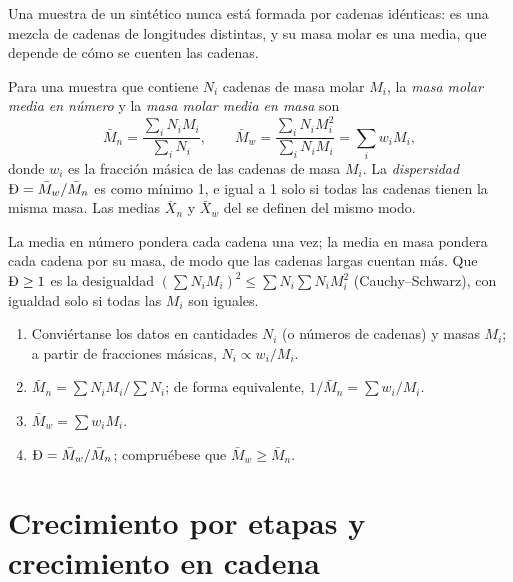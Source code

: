 Una muestra de un  sintético nunca está formada por cadenas idénticas: es una mezcla de cadenas de
longitudes distintas, y su masa molar es una media, que depende de cómo se cuenten las cadenas.

\begin{definition}\label{def:b2:polymer-synthesis:averages}
Para una muestra que contiene $N_i$ cadenas de masa molar $M_i$, la \emph{masa molar media en
número} y la \emph{masa molar media en masa}
son
\begin{equation*}
\bar M_n = \frac{\sum_i N_i M_i}{\sum_i N_i}, \qquad
\bar M_w = \frac{\sum_i N_i M_i^2}{\sum_i N_i M_i} = \sum_i w_i M_i,
\end{equation*}
donde $w_i$ es la fracción másica de las cadenas de masa $M_i$. La \emph{dispersidad}
$\text{\DH} = \bar M_w/\bar M_n$ es como mínimo 1, e igual a 1 solo si todas las cadenas tienen la misma
masa. Las medias $\bar X_n$ y $\bar X_w$ del  se definen del mismo
modo.
\end{definition}

La media en número pondera cada cadena una vez; la media en masa pondera cada cadena por su masa, de modo que las
cadenas largas cuentan más. Que $\text{\DH} \ge 1$ es la desigualdad $\left(\sum N_i M_i\right)^2 \le
\sum N_i \sum N_i M_i^2$ (Cauchy--Schwarz), con igualdad solo si todas las $M_i$ son iguales.

\begin{method}\label{met:b2:polymer-synthesis:averages}
\begin{enumerate}
  \item Conviértanse los datos en cantidades $N_i$ (o números de cadenas) y masas $M_i$; a partir de fracciones másicas,
        $N_i \propto w_i/M_i$.
  \item $\bar M_n = \sum N_i M_i / \sum N_i$; de forma equivalente, $1/\bar M_n = \sum w_i/M_i$.
  \item $\bar M_w = \sum w_i M_i$.
  \item $\text{\DH} = \bar M_w/\bar M_n$; compruébese que $\bar M_w \ge \bar M_n$.
\end{enumerate}
\end{method}

\section{Crecimiento por etapas y crecimiento en cadena}


